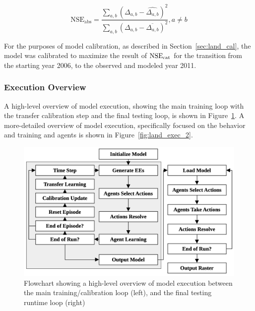 \begin{equation}
    \label{eq:nse_act}
    \text{NSE}_{\text{abs}} 
    =
    \frac{\sum_{a,b}\left(\Delta_{a,b} - \widehat{\Delta_{a,b}}\right)^2}
        {\sum_{a,b}\left(\Delta_{a,b} - \overline{\Delta_{a,b}}\right)^2}
    ,
    a\ne b
\end{equation}

For the purposes of model calibration,
as described in Section~\ref{sec:land_cal},
the model was calibrated to maximize the result of $\text{NSE}_{\text{cat}}$
for the transition from the starting year 2006,
to the observed and modeled year 2011.

\subsubsection{Execution Overview}

A high-level overview of model execution,
showing the main training loop with the transfer calibration step
and the final testing loop, is shown 
in Figure~\ref{fig:land_exec_training}.
A more-detailed overview of model execution, specifically focused on
the behavior and training and agents is
shown in Figure~\ref{fig:land_exec_2}.

\begin{figure}
\centering
    \includegraphics[width=0.7\linewidth]{figure/land-flow}
    \caption{Flowchart showing a high-level overview of model
    execution between the main training/calibration loop (left),
    and the final testing runtime loop (right)}
    \label{fig:land_exec_training}
\end{figure}

